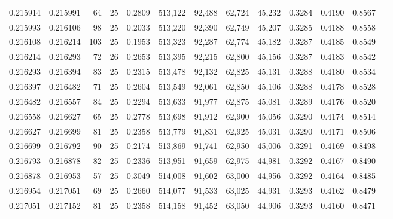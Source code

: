\begin{tabular}{rrrrrrrrrrrrr}
0.215914 & 0.215991 &    64 &  25 &                                     0.2809 & 513,122 &  92,488 &  62,724 &  45,232 & 0.3284 & 0.4190 & 0.8567 \\
0.215993 & 0.216106 &    98 &  25 &                                     0.2033 & 513,220 &  92,390 &  62,749 &  45,207 & 0.3285 & 0.4188 & 0.8558 \\
0.216108 & 0.216214 &   103 &  25 &                                     0.1953 & 513,323 &  92,287 &  62,774 &  45,182 & 0.3287 & 0.4185 & 0.8549 \\
0.216214 & 0.216293 &    72 &  26 &                                     0.2653 & 513,395 &  92,215 &  62,800 &  45,156 & 0.3287 & 0.4183 & 0.8542 \\
0.216293 & 0.216394 &    83 &  25 &                                     0.2315 & 513,478 &  92,132 &  62,825 &  45,131 & 0.3288 & 0.4180 & 0.8534 \\
0.216397 & 0.216482 &    71 &  25 &                                     0.2604 & 513,549 &  92,061 &  62,850 &  45,106 & 0.3288 & 0.4178 & 0.8528 \\
0.216482 & 0.216557 &    84 &  25 &                                     0.2294 & 513,633 &  91,977 &  62,875 &  45,081 & 0.3289 & 0.4176 & 0.8520 \\
0.216558 & 0.216627 &    65 &  25 &                                     0.2778 & 513,698 &  91,912 &  62,900 &  45,056 & 0.3290 & 0.4174 & 0.8514 \\
0.216627 & 0.216699 &    81 &  25 &                                     0.2358 & 513,779 &  91,831 &  62,925 &  45,031 & 0.3290 & 0.4171 & 0.8506 \\
0.216699 & 0.216792 &    90 &  25 &                                     0.2174 & 513,869 &  91,741 &  62,950 &  45,006 & 0.3291 & 0.4169 & 0.8498 \\
0.216793 & 0.216878 &    82 &  25 &                                     0.2336 & 513,951 &  91,659 &  62,975 &  44,981 & 0.3292 & 0.4167 & 0.8490 \\
0.216878 & 0.216953 &    57 &  25 &                                     0.3049 & 514,008 &  91,602 &  63,000 &  44,956 & 0.3292 & 0.4164 & 0.8485 \\
0.216954 & 0.217051 &    69 &  25 &                                     0.2660 & 514,077 &  91,533 &  63,025 &  44,931 & 0.3293 & 0.4162 & 0.8479 \\
0.217051 & 0.217152 &    81 &  25 &                                     0.2358 & 514,158 &  91,452 &  63,050 &  44,906 & 0.3293 & 0.4160 & 0.8471 \\

\end{tabular}

